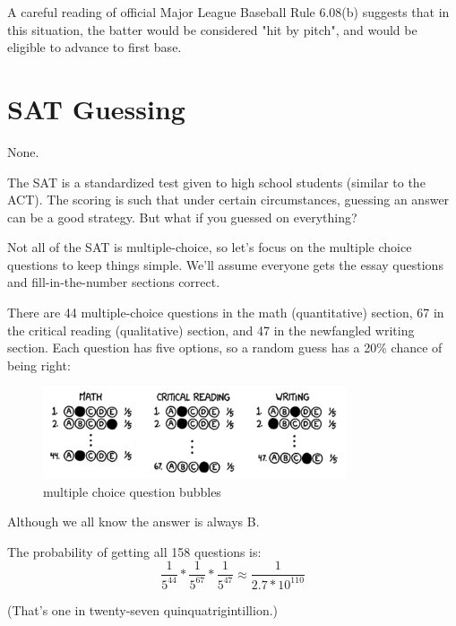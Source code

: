 {A careful reading of official Major League Baseball Rule 6.08(b) suggests that in this situation, the batter would be considered "hit by pitch", and would be eligible to advance to first base.}

{
\chapter{SAT Guessing}
}

\hfill{}

{None.}

{The SAT is a standardized test given to high school students (similar to the ACT). The scoring is such that under certain circumstances, guessing an answer can be a good strategy. But what if you guessed on everything?}

{Not all of the SAT is multiple-choice, so let’s focus on the multiple choice questions to keep things simple. We’ll assume everyone gets the essay questions and fill-in-the-number sections correct.}

{There are 44 multiple-choice questions in the math (quantitative) section, 67 in the critical reading (qualitative) section, and 47 in the newfangled writing section. Each question has five options, so a random guess has a 20\% chance of being right:}

\begin{figure}[!htbp]
\centering
\includegraphics[scale=0.5, max width=0.8\textwidth]{imgs/a/2/01.png}
\caption{multiple choice question bubbles}
\end{figure}

{Although we all know the answer is always B.}

{The probability of getting all 158 questions is:\[\frac{1}{5^{44}} *\frac{1}{5^{67}} *\frac{1}{5^{47}}\approx\frac{1}{2.7 * 10^{110}}\]}

{(That's one in twenty-seven quinquatrigintillion.)}

